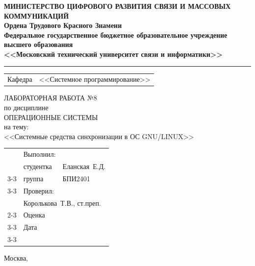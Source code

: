 \thispagestyle{empty}

\begin{center}
	\textbf{МИНИСТЕРСТВО ЦИФРОВОГО РАЗВИТИЯ СВЯЗИ И МАССОВЫХ КОММУНИКАЦИЙ} \\
	\textbf{Ордена Трудового Красного Знамени \\
		Федеральное государственное бюджетное образовательное учреждение высшего образования \\
		<<Московский технический университет связи и информатики>>}
\end{center}
\rule{\linewidth}{1pt}

\vspace{0.3em}

\begin{center}
	\begin{tabularx}{0.6\textwidth}{p{1.2cm}X}
		Кафедра & \quad <<Системное программирование>> \\%
	\end{tabularx}
\end{center}

\vspace{10em}

\begin{center}
	\Large
	ЛАБОРАТОРНАЯ РАБОТА №8 \\
	\large
	по дисциплине \\
	ОПЕРАЦИОННЫЕ СИСТЕМЫ \\
	на тему: \\
	<<Системные средства синхронизации в ОС GNU/LINUX>>
\end{center}

\vspace{4em}

\renewcommand{\arraystretch}{1.1}
\begin{tabularx}{\textwidth}{p{10cm}p{2cm}p{3cm}}
	& Выполнил: & \\
	& студентка & Еланская~Е.Д. \\\cline{3-3} 
	& группа & БПИ2401 \\\cline{3-3} 
	& Проверил: &  \\
	& \multicolumn{2}{l}{Королькова~Т.В., ст.преп.} \\\cline{2-3}
	& Оценка & \\\cline{3-3} 
	& Дата & \\\cline{3-3} 
\end{tabularx}

\vspace{5em}

\begin{center}
	Москва,~\the\year
\end{center}
\clearpage

